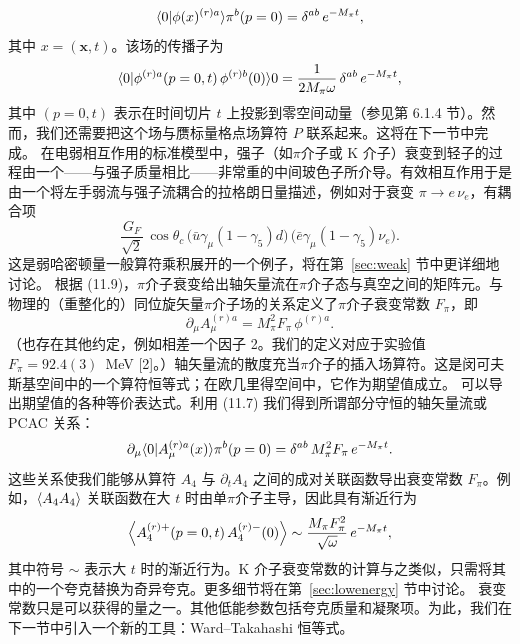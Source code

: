 \begin{equation}
\langle0|\phi(x)^{(r)a}\rangle{\pi^b(p = 0)} = \delta^{ab}\, e^{-M_\pi t} ,
\end{equation}
其中 $x = (\mathbf{x}, t)$。该场的传播子为
\begin{equation}
\langle0|\phi^{(r)a}(p = 0, t)\,\phi^{(r)b}(0)\rangle{0} =
\frac{1}{2M_\pi\omega}\,\delta^{ab}\, e^{-M_\pi t} ,
\end{equation}
其中 $(p = 0, t)$ 表示在时间切片 $t$ 上投影到零空间动量（参见第 6.1.4 节）。然而，我们还需要把这个场与赝标量格点场算符 $P$ 联系起来。这将在下一节中完成。
在电弱相互作用的标准模型中，强子（如$\pi$介子或 K 介子）衰变到轻子的过程由一个——与强子质量相比——非常重的中间玻色子所介导。有效相互作用于是由一个将左手弱流与强子流耦合的拉格朗日量描述，例如对于衰变 $\pi \to e\,\nu_e$，有耦合项
\begin{equation}
\frac{G_F}{\sqrt{2}}\,\cos\theta_c\, \bigl(\bar{u}\gamma_\mu(1-\gamma_5)d\bigr)\,
\bigl(\bar{e}\gamma_\mu(1-\gamma_5)\nu_e\bigr) .
\end{equation}
这是弱哈密顿量一般算符乘积展开的一个例子，将在第~\ref{sec:weak} 节中更详细地讨论。
根据 (11.9)，$\pi$介子衰变给出轴矢量流在$\pi$介子态与真空之间的矩阵元。与物理的（重整化的）同位旋矢量$\pi$介子场的关系定义了$\pi$介子衰变常数 $F_\pi$，即
\begin{equation}
\partial_\mu A_\mu^{(r)a} = M_\pi^2 F_\pi\, \phi^{(r)a} .
\end{equation}
（也存在其他约定，例如相差一个因子 2。我们的定义对应于实验值 $F_\pi = 92.4(3)$~MeV [2]。）轴矢量流的散度充当$\pi$介子的插入场算符。这是闵可夫斯基空间中的一个算符恒等式；在欧几里得空间中，它作为期望值成立。
可以导出期望值的各种等价表达式。利用 (11.7) 我们得到所谓部分守恒的轴矢量流或 PCAC 关系：
\begin{equation}
\partial_\mu \langle0|A_\mu^{(r)a}(x)\rangle{\pi^b(p = 0)} = \delta^{ab}\, M_\pi^2 F_\pi\, e^{-M_\pi t} .
\end{equation}
这些关系使我们能够从算符 $A_4$ 与 $\partial_t A_4$ 之间的成对关联函数导出衰变常数 $F_\pi$。例如，$\left\langle A_4 A_4 \right\rangle$ 关联函数在大 $t$ 时由单$\pi$介子主导，因此具有渐近行为
\begin{equation}
\left\langle A_4^{(r)+}(p = 0, t)\, A_4^{(r)-}(0) \right\rangle \sim \frac{M_\pi F_\pi^2}{\sqrt{\omega}}\, e^{-M_\pi t} ,
\end{equation}
其中符号 $\sim$ 表示大 $t$ 时的渐近行为。K 介子衰变常数的计算与之类似，只需将其中的一个夸克替换为奇异夸克。更多细节将在第~\ref{sec:lowenergy} 节中讨论。
衰变常数只是可以获得的量之一。其他低能参数包括夸克质量和凝聚项。为此，我们在下一节中引入一个新的工具：Ward–Takahashi 恒等式。

